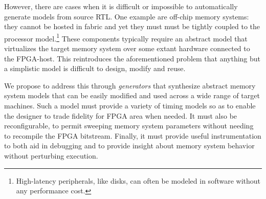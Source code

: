 However, there are cases when it is difficult or impossible to automatically
generate models from source RTL. One example are off-chip memory systems: they
cannot be hosted in fabric and yet they must must be tightly coupled to the
processor model.\footnote{High-latency peripherals, like disks, can often be
modeled in software without any performance cost.\cite{disksim}} These
components typically require an abstract model that virtualizes the target
memory system over some extant hardware connected to the FPGA-host. This
reintroduces the aforementioned problem that anything but a simplistic model is
difficult to design, modify and reuse.

We propose to address this through \emph{generators} that synthesize abstract
memory system models that can be easily modified and used across a wide range
of target machines. Such a model must provide a variety of timing models so as
to enable the designer to trade fidelity for FPGA area when needed. It must
also be reconfigurable, to permit sweeping memory system parameters without
needing to recompile the FPGA bitstream. Finally, it must provide useful
instrumentation to both aid in debugging and to provide insight about memory
system behavior without perturbing execution.
